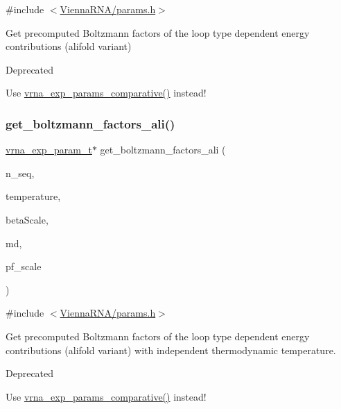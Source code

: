 {\ttfamily \#include $<$\mbox{\hyperlink{params_8h}{Vienna\+R\+N\+A/params.\+h}}$>$}



Get precomputed Boltzmann factors of the loop type dependent energy contributions (alifold variant) 

\begin{DoxyRefDesc}{Deprecated}
\item[\mbox{\hyperlink{deprecated__deprecated000097}{Deprecated}}]Use \mbox{\hyperlink{group__energy__parameters_gaf78c09e685e6eef4100b1a41d4042550}{vrna\+\_\+exp\+\_\+params\+\_\+comparative()}} instead!\end{DoxyRefDesc}
\mbox{\label{group__energy__parameters_ga2aa1d87c97f35d2e4121634a17556829}} 
\subsubsection{\texorpdfstring{get\+\_\+boltzmann\+\_\+factors\+\_\+ali()}{get\_boltzmann\_factors\_ali()}}
{\footnotesize\ttfamily \mbox{\hyperlink{group__energy__parameters_ga01d8b92fe734df8d79a6169482c7d8d8}{vrna\+\_\+exp\+\_\+param\+\_\+t}}$\ast$ get\+\_\+boltzmann\+\_\+factors\+\_\+ali (\begin{DoxyParamCaption}\item[{unsigned int}]{n\+\_\+seq,  }\item[{double}]{temperature,  }\item[{double}]{beta\+Scale,  }\item[{\mbox{\hyperlink{group__model__details_ga1f8a10e12a0a1915f2a4eff0b28ea17c}{vrna\+\_\+md\+\_\+t}}}]{md,  }\item[{double}]{pf\+\_\+scale }\end{DoxyParamCaption})}



{\ttfamily \#include $<$\mbox{\hyperlink{params_8h}{Vienna\+R\+N\+A/params.\+h}}$>$}



Get precomputed Boltzmann factors of the loop type dependent energy contributions (alifold variant) with independent thermodynamic temperature. 

\begin{DoxyRefDesc}{Deprecated}
\item[\mbox{\hyperlink{deprecated__deprecated000098}{Deprecated}}]Use \mbox{\hyperlink{group__energy__parameters_gaf78c09e685e6eef4100b1a41d4042550}{vrna\+\_\+exp\+\_\+params\+\_\+comparative()}} instead!\end{DoxyRefDesc}
\mbox{\label{group__energy__parameters_ga541f2cf7436e9bc939b0a49b24baf987}} 
